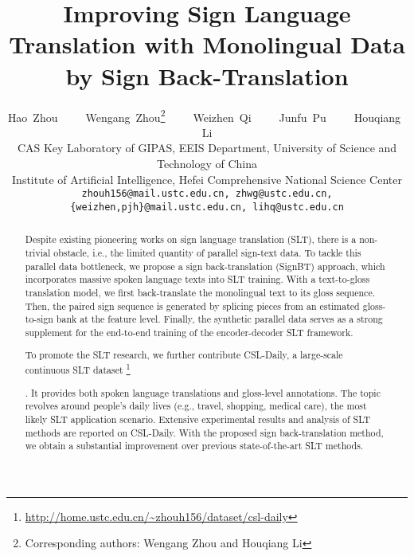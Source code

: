 \documentclass[final]{cvpr}
\newcommand\blfootnote[1]{\begingroup 
\renewcommand\thefootnote{}\footnote{#1}\addtocounter{footnote}{-1}\endgroup 
}
\begin{document}
\title{Improving Sign Language Translation with Monolingual Data\\by Sign Back-Translation}

\author{Hao~Zhou~~~~~Wengang~Zhou\thanks{Corresponding authors: Wengang Zhou and Houqiang Li}~~~~~Weizhen~Qi~~~~~Junfu~Pu~~~~~Houqiang~Li\footnotemark[1]\\
{\normalsize CAS Key Laboratory of GIPAS, EEIS Department, University of Science and Technology of China}\\
{\normalsize Institute of Artificial Intelligence, Hefei Comprehensive National Science Center}\\
{\tt\small zhouh156@mail.ustc.edu.cn, zhwg@ustc.edu.cn, \{weizhen,pjh\}@mail.ustc.edu.cn, lihq@ustc.edu.cn}
}

\maketitle
\thispagestyle{empty}
\pagestyle{empty}

\begin{abstract}
Despite existing pioneering works on sign language translation (SLT), there is a non-trivial obstacle, i.e., the limited quantity of parallel sign-text data. 
To tackle this parallel data bottleneck, we propose a sign back-translation (SignBT) approach, which incorporates massive spoken language texts into SLT training. 
With a text-to-gloss translation model, we first back-translate the monolingual text to its gloss sequence. 
Then, the paired sign sequence is generated by splicing pieces from an estimated gloss-to-sign bank at the feature level. 
Finally, the synthetic parallel data serves as a strong supplement for the end-to-end training of the encoder-decoder SLT framework. 

To promote the SLT research, we further contribute CSL-Daily, a large-scale continuous SLT dataset\blfootnote{\scriptsize{\url{http://home.ustc.edu.cn/~zhouh156/dataset/csl-daily}}}. 
It provides both spoken language translations and gloss-level annotations. 
The topic revolves around people's daily lives (e.g., travel, shopping, medical care), the most likely SLT application scenario.
Extensive experimental results and analysis of SLT methods are reported on CSL-Daily. 
With the proposed sign back-translation method, we obtain a substantial improvement over previous state-of-the-art SLT methods. 

\vspace{-4pt}
\end{abstract}
\end{document}

